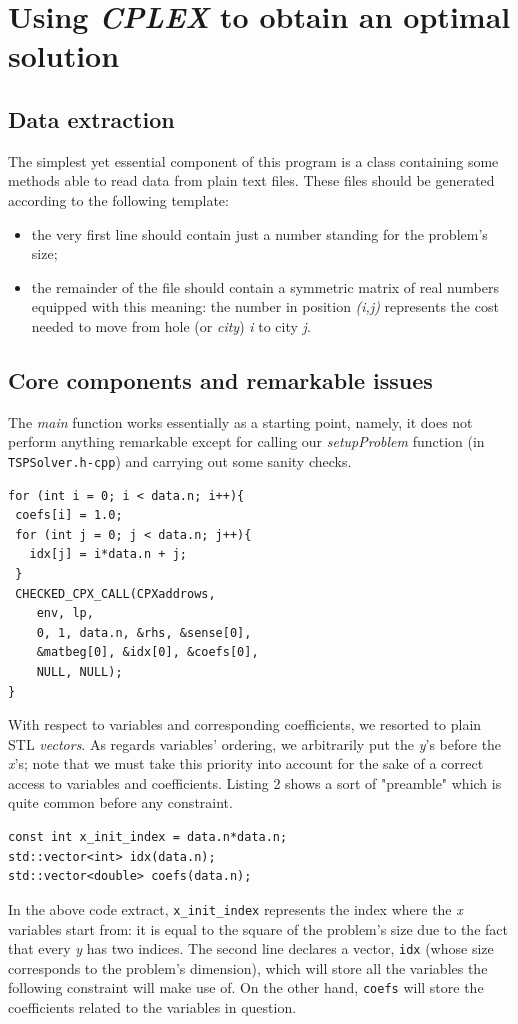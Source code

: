 \documentclass[letterpaper, 10 pt, conference]{ieeeconf}  %
\begin{document}
\section{Using \textit{CPLEX} to obtain an optimal solution}

\subsection{Data extraction}
The simplest yet essential component of this program is a class containing some methods able to read data from plain text files. These files should be generated according to the following template:
\begin{itemize}
\item the very first line should contain just a number standing for the problem's size;
\item the remainder of the file should contain a symmetric matrix of real numbers equipped with this meaning: the number in position \textit{(i,j)} represents the cost needed to move from hole (or \textit{city}) \textit{i} to city \textit{j}.
\end{itemize}

\subsection{Core components and remarkable issues}
The \textit{main} function works essentially as a starting point, namely, it does not perform anything remarkable except for calling our \textit{setupProblem} function (in \texttt{TSPSolver.h-cpp}) and carrying out some sanity checks.
\lstset{language=C++,
  basicstyle=\ttfamily,
}
\begin{lstlisting}[caption={Visit constraint}]
for (int i = 0; i < data.n; i++){
 coefs[i] = 1.0;
 for (int j = 0; j < data.n; j++){
   idx[j] = i*data.n + j;
 }
 CHECKED_CPX_CALL(CPXaddrows,
    env, lp, 
    0, 1, data.n, &rhs, &sense[0], 
    &matbeg[0], &idx[0], &coefs[0],
    NULL, NULL);
}
\end{lstlisting} 
With respect to variables and corresponding coefficients, we resorted to plain STL 
\textit{vectors}. As regards variables' ordering, we arbitrarily put the \textit{y}'s before the \textit{x}'s; note that we must take this priority into account for the sake of a correct access to variables and coefficients. Listing 2
shows a sort of "preamble" which is quite common before any constraint.
\begin{lstlisting}[caption={Important data structure declarations}]
const int x_init_index = data.n*data.n;
std::vector<int> idx(data.n);
std::vector<double> coefs(data.n);
\end{lstlisting}
In the above code extract, \texttt{x\_init\_index} represents the index where
the \textit{x} variables start from: it is equal to the square of the problem's size due to the fact that every \textit{y} has two indices. The second line declares a vector, \texttt{idx} (whose size corresponds to the problem's dimension), which will store all the variables the following constraint will make use of. On the other hand, \texttt{coefs} will store the coefficients related to the variables in question.
\end{document}
